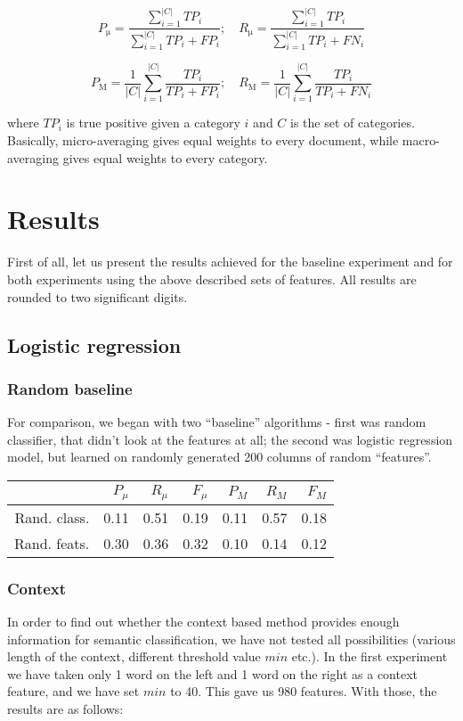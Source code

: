 \documentclass[letterpaper]{article}
\begin{document}
$$P_{\mathrm{\mu}} = \frac{\sum_{i=1}^{|C|}TP_{i}}{\sum_{i=1}^{|C|}TP_{i}+FP_{i}}; \quad R_{\mathrm{\mu}} = \frac{\sum_{i=1}^{|C|}TP_{i}}{\sum_{i=1}^{|C|}TP_{i}+FN_{i}}$$

$$P_{\mathrm{M}}=\frac{1}{|C|}\sum_{i=1}^{|C|}\frac{TP_{i}}{TP_{i}+FP_{i}};\quad R_{\mathrm{M}}=\frac{1}{|C|}\sum_{i=1}^{|C|}\frac{TP_{i}}{TP_{i}+FN_{i}}$$

where $TP_i$ is true positive given a category $i$ and $C$ is the set of categories. Basically, micro-averaging gives equal weights to every document, while macro-averaging gives equal weights to every category.

\section{Results}
First of all, let us present the results achieved for the baseline experiment and for both experiments using the above described sets of features. 
All results are rounded to two significant digits.

\subsection{Logistic regression}
\subsubsection{Random baseline}

For comparison, we began with two ``baseline'' algorithms - first was random classifier, that didn't look at the features at all; the second was logistic regression model, but learned on randomly generated 200 columns of random ``features''.

\begin{table}[h]
\begin{tabular}{|r|r|r|r|r|r|r|}
 \hline
 & $P_\mu$ & $R_\mu$ & $F_\mu$ & $P_M$ & $R_M$  & $F_M$ \\ \hline
Rand. class. & 0.11 & 0.51 & 0.19 & 0.11 & 0.57 & 0.18 \\ \hline
Rand. feats. & 0.30 & 0.36 & 0.32 & 0.10 & 0.14 & 0.12 \\ \hline
\end{tabular}
\end{table}


\subsubsection{Context}
In order to find out whether the context based method provides enough information for semantic classification, we have not tested all possibilities (various length of the context, different threshold value $min$ etc.). In the first experiment we have taken only 1 word on the left and 1 word on the right as a context feature, and we have set $min$ to 40. This gave us 980 features. With those, the results are as follows:
\end{document}
